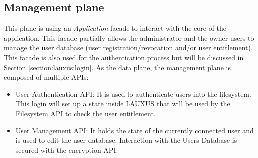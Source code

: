 \documentclass[../main.tex]{subfiles}
\begin{document}
\subsection{Management plane}
\label{section:lauxus:architecture_mgmntplane}
\par This plane is using an \textit{Application} facade to interact with the core of the application. This facade partially allows the administrator and the owner users to manage the user database (user registration/revocation and/or user entitlement). This facade is also used for the authentication process but will be discussed in Section \ref{section:lauxus:login}. As the data plane, the management plane is composed of multiple APIs:
\begin{itemize}
    \item User Authentication API: It is used to authenticate users into the filesystem. This login will set up a state inside LAUXUS that will be used by the Filesystem API to check the user entitlement.
    \item User Management API: It holds the state of the currently connected user and is used to edit the user database. Interaction with the Users Database is secured with the encryption API.
\end{itemize}
\end{document}
